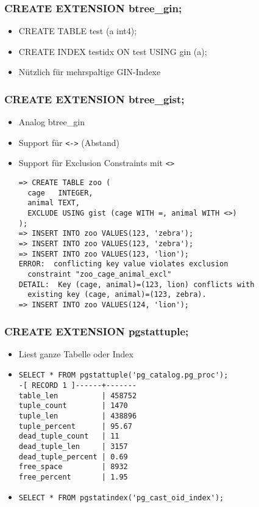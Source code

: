 \documentclass[utf8,hyperref={pdftex,colorlinks,linkcolor=black,citecolor=black,urlcolor=black,filecolor=black,plainpages=false},xcolor=table,hyperref]{beamer}
\begin{document}
\begin{frame}[containsverbatim]
	\frametitle{CREATE EXTENSION btree_gin;}
	\begin{itemize}
		\item CREATE TABLE test (a int4);
		\item CREATE INDEX testidx ON test USING gin (a);
		\item Nützlich für mehrspaltige GIN-Indexe
	\end{itemize}
\end{frame}

\begin{frame}[containsverbatim]
	\frametitle{CREATE EXTENSION btree_gist;}
	\begin{itemize}
		\item Analog btree_gin
		\item Support für \verb|<->| (Abstand)
		\item Support für Exclusion Constraints mit \verb|<>|
			\begin{verbatim}
=> CREATE TABLE zoo (
  cage   INTEGER,
  animal TEXT,
  EXCLUDE USING gist (cage WITH =, animal WITH <>)
);
=> INSERT INTO zoo VALUES(123, 'zebra');
=> INSERT INTO zoo VALUES(123, 'zebra');
=> INSERT INTO zoo VALUES(123, 'lion');
ERROR:  conflicting key value violates exclusion
  constraint "zoo_cage_animal_excl"
DETAIL:  Key (cage, animal)=(123, lion) conflicts with
  existing key (cage, animal)=(123, zebra).
=> INSERT INTO zoo VALUES(124, 'lion');
\end{verbatim}
\end{itemize}
\end{frame}

\begin{frame}[containsverbatim]
	\frametitle{CREATE EXTENSION pgstattuple;}
	\begin{itemize}
		\item Liest ganze Tabelle oder Index
		\item \begin{verbatim}
SELECT * FROM pgstattuple('pg_catalog.pg_proc');
-[ RECORD 1 ]------+-------
table_len          | 458752
tuple_count        | 1470
tuple_len          | 438896
tuple_percent      | 95.67
dead_tuple_count   | 11
dead_tuple_len     | 3157
dead_tuple_percent | 0.69
free_space         | 8932
free_percent       | 1.95
\end{verbatim}
\item \begin{verbatim}
SELECT * FROM pgstatindex('pg_cast_oid_index');
\end{verbatim}
\end{itemize}
\end{frame}
\end{document}
